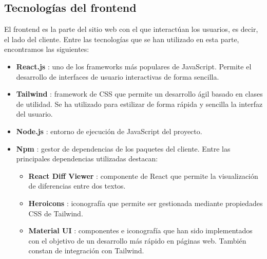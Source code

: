 \subsection{Tecnologías del frontend}

El frontend es la parte del sitio web con el que interactúan los usuarios, es decir, el lado del cliente. Entre las tecnologías que se han utilizado en esta parte, encontramos las siguientes:

\begin{itemize}
    \item {\bf React.js} \cite{react}: uno de los frameworks más populares de JavaScript. Permite el desarrollo de interfaces de usuario interactivas de forma sencilla.
    \item {\bf Tailwind} \cite{tailwind}: framework de CSS \cite{css} que permite un desarrollo ágil basado en clases de utilidad. Se ha utilizado para estilizar de forma rápida y sencilla la interfaz del usuario.
    \item {\bf Node.js} \cite{nodejs}: entorno de ejecución de JavaScript del proyecto.
    \item {\bf Npm} \cite{npm}: gestor de dependencias de los paquetes del cliente. Entre las principales dependencias utilizadas destacan:
        \begin{itemize}
        \item {\bf React Diff Viewer} \cite{reactdiffviewer}: componente de React que permite la visualización de diferencias entre dos textos.
        \item {\bf Heroicons} \cite{heroicons}: iconografía que permite ser gestionada mediante propiedades CSS de Tailwind.
        \item {\bf Material UI} \cite{materialui}: componentes e iconografía que han sido implementados con el objetivo de un desarrollo más rápido en páginas web. También constan de integración con Tailwind.
        \end{itemize}
\end{itemize}